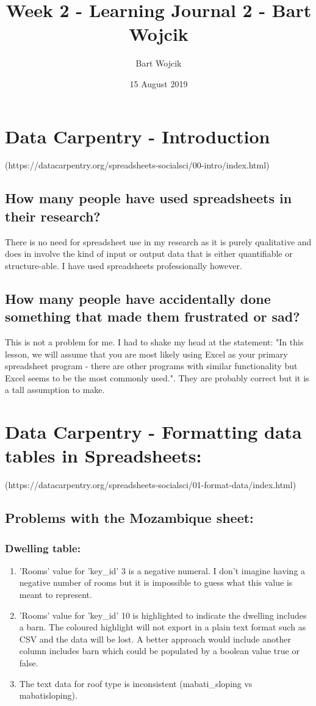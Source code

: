 \documentclass{article}
\title{Week 2 - Learning Journal 2 - Bart Wojcik}
\author{Bart Wojcik}
\date{15 August 2019}
\begin{document}
\maketitle

\section{Data Carpentry - Introduction}
(https://datacarpentry.org/spreadsheets-socialsci/00-intro/index.html)
\subsection{How many people have used spreadsheets in their research?}
There is no need for spreadsheet use in my research as it is purely qualitative and does in involve the kind of input or output data that is either quantifiable or structure-able. I have used spreadsheets professionally however.
\subsection{How many people have accidentally done something that made them frustrated or sad?}
This is not a problem for me. I had to shake my head at the statement: "In this lesson, we will assume that you are most likely using Excel as your primary spreadsheet program - there are other programs with similar functionality but Excel seems to be the most commonly used.". They are probably correct but it is a tall assumption to make.

\section{Data Carpentry - Formatting data tables in Spreadsheets:}
(https://datacarpentry.org/spreadsheets-socialsci/01-format-data/index.html)

\subsection{Problems with the Mozambique sheet:}
\subsubsection{Dwelling table:}
\begin{enumerate}
    \item 'Rooms' value for 'key\_id' 3 is a negative numeral. I don't imagine having a negative number of rooms but it is impossible to guess what this value is meant to represent.
    \item 'Rooms' value for 'key\_id' 10 is highlighted to indicate the dwelling includes a barn. The coloured highlight will not export in a plain text format such as CSV and the data will be lost. A better approach would include another column includes barn which could be populated by a boolean value true or false.
    \item The text data for roof type is inconsistent (mabati\_sloping vs mabatisloping).
\end{enumerate}
\end{document}
